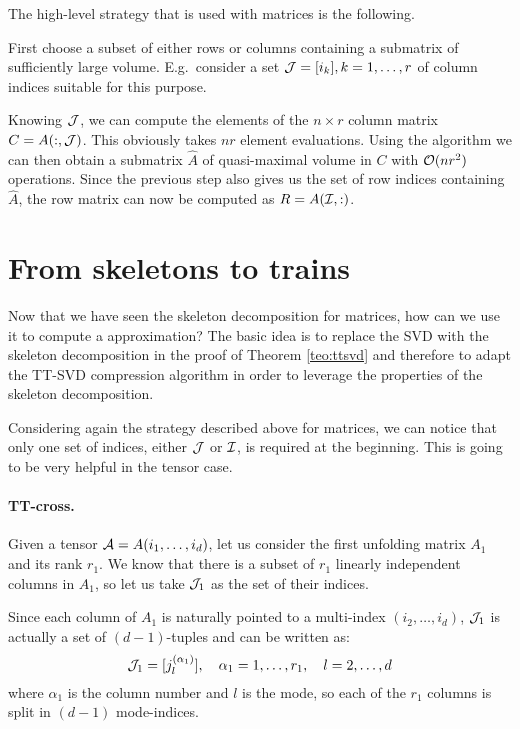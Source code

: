 The high-level strategy that is used with matrices is the following.

First choose a subset of either rows or columns containing a submatrix of sufficiently large volume. E.g.\ consider a set $\mathcal{J} = [i_k], k=1,\ldots,r$ of column indices suitable for this purpose.

Knowing $\mathcal{J}$, we can compute the elements of the $n \times r$ column matrix $C = A(:,\mathcal{J})$. This obviously takes $nr$ element evaluations.
Using the  algorithm we can then obtain a submatrix $\hat{A}$ of quasi-maximal volume in $C$ with $\mathcal{O}(nr^2)$ operations.
Since the previous step also gives us the set of row indices containing $\hat{A}$, the row matrix can now be computed as $R = A(\mathcal{I},:)$.

\section{From skeletons to trains}
Now that we have seen the skeleton decomposition for matrices, how can we use it to compute a  approximation?
The basic idea is to replace the SVD with the skeleton decomposition in the proof of Theorem \ref{teo:ttsvd} and therefore to adapt the TT-SVD compression algorithm in order to leverage the properties of the skeleton decomposition.

Considering again the strategy described above for matrices, we can notice that only one set of indices, either $\mathcal{J}$ or $\mathcal{I}$, is required at the beginning. This is going to be very helpful in the tensor case.

\paragraph{TT-cross.}
Given a tensor $\mathcal{A} = A(i_1,\ldots,i_d)$, let us consider the first unfolding matrix $A_1$ and its rank $r_1$. We know that there is a subset of $r_1$ linearly independent columns in $A_1$, so let us take $\mathcal{J}_1$ as the set of their indices.

Since each column of $A_1$ is naturally pointed to a multi-index $(i_2,\ldots,i_d)$, $\mathcal{J}_1$ is actually a set of $(d-1)$-tuples and can be written as:
\begin{equation*}
  \mathcal{J}_1 = [j_l^{(\alpha_1)}], \quad \alpha_1 = 1,\ldots,r_1, \quad l = 2,\ldots,d
\end{equation*}
where $\alpha_1$ is the column number and $l$ is the mode, so each of the $r_1$ columns is split in $(d-1)$ mode-indices.

